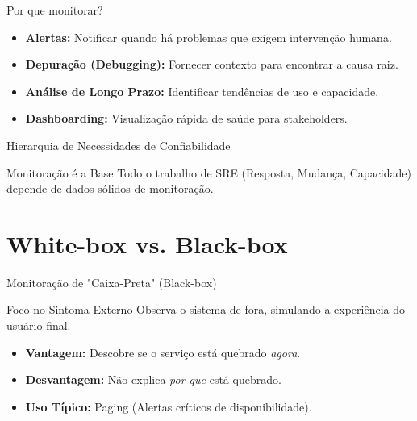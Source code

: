 \documentclass[9pt]{beamer}
\begin{document}
\begin{frame}{Por que monitorar?}
\begin{itemize}
    \item \textbf{Alertas:} Notificar quando há problemas que exigem intervenção humana.
    \item \textbf{Depuração (Debugging):} Fornecer contexto para encontrar a causa raiz.
    \item \textbf{Análise de Longo Prazo:} Identificar tendências de uso e capacidade.
    \item \textbf{Dashboarding:} Visualização rápida de saúde para stakeholders.
\end{itemize}
\end{frame}

\begin{frame}{Hierarquia de Necessidades de Confiabilidade}
\begin{center}
\end{center}
\begin{block}{Monitoração é a Base}
Todo o trabalho de SRE (Resposta, Mudança, Capacidade) depende de dados sólidos de monitoração.
\end{block}
\end{frame}

\section{White-box vs. Black-box}

\begin{frame}{Monitoração de "Caixa-Preta" (Black-box)}
\begin{block}{Foco no Sintoma Externo}
Observa o sistema de fora, simulando a experiência do usuário final.
\end{block}
\begin{itemize}
    \item \textbf{Vantagem:} Descobre se o serviço está quebrado \textit{agora}.
    \item \textbf{Desvantagem:} Não explica \textit{por que} está quebrado.
    \item \textbf{Uso Típico:} Paging (Alertas críticos de disponibilidade).
\end{itemize}
\end{frame}
\end{document}
